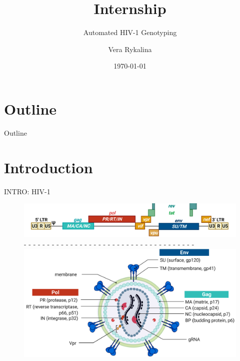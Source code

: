 \documentclass{beamer}
\title[Short Title]{Internship}
\subtitle{Automated HIV-1 Genotyping}
\author{\vspace{50pt} Vera Rykalina}
\institute{CQ Beratung\&Bildung/Robert Koch Institute}
\date{\today}
\begin{document}



\begin{frame}
\titlepage
\end{frame}

\section{Outline}
\begin{frame}{Outline}
\tableofcontents
\end{frame}



\section{Introduction}
\begin{frame}{INTRO: HIV-1 \cite{toxins14020138}} 
\begin{figure}
\centering
\includegraphics[scale=0.07]{toxins-14-00138-g001.png}\\
- - - - - - - - - - - - - - - - - - - - - - - - - - - - - - - - - - - - -\\
\vspace{6pt}
\centering
\includegraphics[scale=0.07]{toxins-14-00138-g002.png}
\end{figure}
\end{frame}
\end{document}
